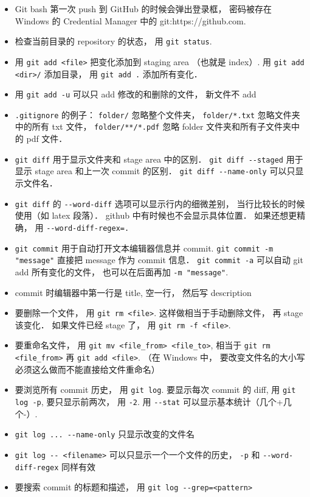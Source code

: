 \begin{itemize}
\item Git bash 第一次 push 到 GitHub 的时候会弹出登录框， 密码被存在 Windows 的 Credential Manager 中的 git:https://github.com.
\item 检查当前目录的 repository 的状态， 用 \verb|git status|. 
\item 用 \verb|git add <file>| 把变化添加到 staging area （也就是 index）. 用 \verb|git add <dir>/| 添加目录， 用 \verb|git add .| 添加所有变化．
\item 用 \verb|git add -u| 可以只 add 修改的和删除的文件， 新文件不 add
\item \verb|.gitignore| 的例子： \verb|folder/| 忽略整个文件夹， \verb|folder/*.txt| 忽略文件夹中的所有 txt 文件， \verb|folder/**/*.pdf| 忽略 folder 文件夹和所有子文件夹中的 pdf 文件．
\item \verb|git diff| 用于显示文件夹和 stage area 中的区别． \verb|git diff --staged| 用于显示 stage area 和上一次 commit 的区别． \verb|git diff --name-only| 可以只显示文件名．
\item \verb|git diff| 的 \verb|--word-diff| 选项可以显示行内的细微差别， 当行比较长的时候使用（如 latex 段落）． github 中有时候也不会显示具体位置． 如果还想更精确， 用 \verb|--word-diff-regex=.|
\item \verb|git commit| 用于自动打开文本编辑器信息并 commit. \verb|git commit -m "message"| 直接把 message 作为 commit 信息． \verb|git commit -a| 可以自动 git add 所有变化的文件， 也可以在后面再加 \verb|-m "message"|.
\item commit 时编辑器中第一行是 title, 空一行， 然后写 description
\item 要删除一个文件， 用 \verb|git rm <file>|. 这样做相当于手动删除文件， 再 stage 该变化． 如果文件已经 stage 了， 用 \verb|git rm -f <file>|.
\item 要重命名文件， 用 \verb|git mv <file_from> <file_to>|, 相当于 \verb|git rm <file_from>| 再 \verb|git add <file>|. （在 Windows 中， 要改变文件名的大小写必须这么做而不能直接给文件重命名）
\item 要浏览所有 commit 历史， 用 \verb|git log|. 要显示每次 commit 的 diff, 用 \verb|git log -p|, 要只显示前两次， 用 \verb|-2|. 用 \verb|--stat| 可以显示基本统计（几个+几个-）.
\item \verb|git log ... --name-only| 只显示改变的文件名
\item \verb|git log -- <filename>| 可以只显示一个一个文件的历史， \verb|-p| 和 \verb|--word-diff-regex| 同样有效
\item 要搜索 commit 的标题和描述， 用 \verb|git log --grep=<pattern>|

\end{itemize}
